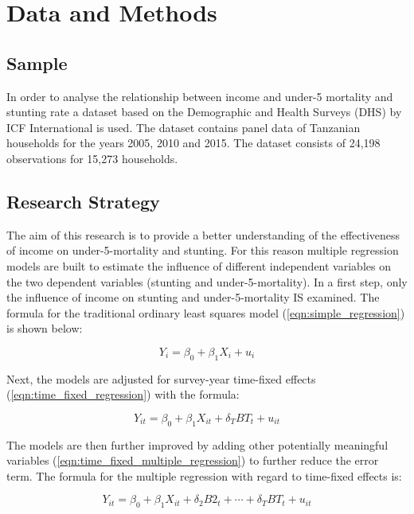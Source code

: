 \documentclass[a4paper, 11pt]{article} %
\begin{document}
\section{Data and Methods}
\subsection*{Sample}

In order to analyse the relationship between income and under-5 mortality and stunting rate a dataset based on the Demographic and Health Surveys (DHS) \cite{DHS20} by ICF International is used. The dataset contains panel data of Tanzanian households for the years 2005, 2010 and 2015. The dataset consists of 24,198 observations for 15,273 households.

\subsection*{Research Strategy}

The aim of this research is to provide a better understanding of the effectiveness of income on under-5-mortality and stunting. For this reason multiple regression models are built to estimate the influence of different independent variables on the two dependent variables (stunting and under-5-mortality). In a first step, only the influence of income on stunting and under-5-mortality IS examined. The formula for the traditional ordinary least squares model (\ref{eqn:simple_regression}) is shown below:

\begin{equation}
 Y_i = \beta_0 + \beta_1 X_i + u_i
 \label{eqn:simple_regression}
\end{equation}

Next, the models are adjusted for survey-year time-fixed effects (\ref{eqn:time_fixed_regression}) with the formula:

\begin{equation}
Y_{it} = \beta_0 + \beta_1 X_{it} + \delta_T BT_t + u_{it}
 \label{eqn:time_fixed_regression}
\end{equation}

The models are then further improved by adding other potentially meaningful variables (\ref{eqn:time_fixed_multiple_regression}) to further reduce the error term. The formula for the multiple regression with regard to time-fixed effects is:

\begin{equation}
Y_{it} = \beta_0 + \beta_1 X_{it} + \delta_2 B2_t + \cdots + \delta_T BT_t + u_{it}
 \label{eqn:time_fixed_multiple_regression}
\end{equation}
\end{document}
